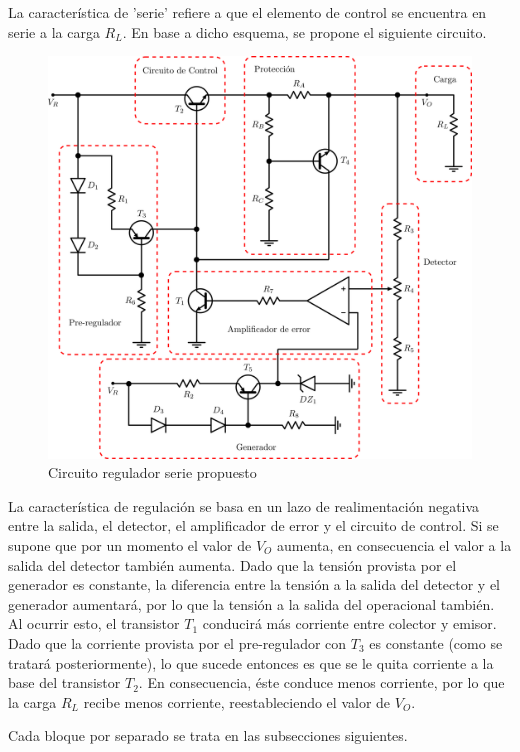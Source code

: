 La caracter\'istica de 'serie' refiere a que el elemento de control se encuentra en serie a la carga $R_L$. En base a dicho esquema, se propone el siguiente circuito.

\begin{figure}[!h]
\begin{centering}
\includegraphics[scale=0.32]{Imagenes/CircuitoSinCap.png}
\par\end{centering}
\caption{Circuito regulador serie propuesto}

\end{figure}

La caracter\'istica de regulaci\'on se basa en un lazo de realimentaci\'on negativa entre la salida, el detector, el amplificador de error y el circuito de control. Si se supone que por un momento el valor de $V_O$ aumenta, en consecuencia el valor a la salida del detector tambi\'en aumenta. Dado que la tensi\'on provista por el generador es constante, la diferencia entre la tensi\'on a la salida del detector y el generador aumentar\'a, por lo que la tensi\'on a la salida del operacional tambi\'en. Al ocurrir esto, el transistor $T_1$ conducir\'a m\'as corriente entre colector y emisor. Dado que la corriente provista por el pre-regulador con $T_3$ es constante (como se tratar\'a posteriormente), lo que sucede entonces es que se le quita corriente a la base del transistor $T_2$. En consecuencia, \'este conduce menos corriente, por lo que la carga $R_L$ recibe menos corriente, reestableciendo el valor de $V_O$.\par
Cada bloque por separado se trata en las subsecciones siguientes.

